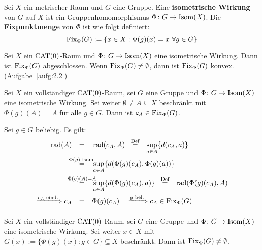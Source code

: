 \begin{definition}
\label{def:1.25}
	Sei $X$ ein metrischer Raum und $G$ eine Gruppe.
	Eine \textbf{isometrische Wirkung} von $G$ auf $X$ ist ein Gruppenhomomorphismus $\Phi \colon G \rightarrow \operatorname{Isom}(X)$. 
	Die \textbf{Fixpunktmenge} von $\Phi$ ist wie folgt definiert: 
	\[
		\operatorname{Fix}_\Phi(G) := \{x \in X : \Phi(g)(x) = x \ \forall g \in G\}
	\]
\end{definition}

\begin{lemma}
\label{lemma:1.26}
	Sei $X$ ein $\operatorname{CAT(0)}$-Raum und $\Phi\colon G \rightarrow \operatorname{Isom}(X)$ eine isometrische Wirkung.
	Dann ist $\operatorname{Fix}_\Phi(G)$ abgeschlossen.
	Wenn $\operatorname{Fix}_\Phi(G) \neq \emptyset$, dann ist $\operatorname{Fix}_\Phi(G)$ konvex. (Aufgabe~\ref{aufg:2.2}) 
\end{lemma}

\begin{satz}
\label{satz:1.27} \label{BTFT}
	Sei $X$ ein vollständiger $\operatorname{CAT(0)}$-Raum, sei $G$ eine Gruppe und $\Phi\colon G \rightarrow \operatorname{Isom}(X)$ eine isometrische Wirkung.  
	Sei weiter $\emptyset \neq A \subseteq X$ beschränkt mit $\Phi(g)(A) = A$ für alle $g \in G$.
	Dann ist $c_A \in \operatorname{Fix}_\Phi(G)$.
\end{satz}

\begin{beweis}
	Sei $g \in G$ beliebig.
	Es gilt:
	\begin{align*}
		\rad(A) &\stack{}{=} \rad(c_A,A) \stack{\text{Def}}{=} \sup_{a \in A}\{ d(c_A,a)\} \\
		&\stack{\Phi(g) \text{ isom.}}{=} \sup_{a \in A} \{d(\Phi(g)(c_A),\Phi(g)(a))\} \\
		&\stack{\Phi(g)(A)=A}{=} \sup_{a \in A} \{d(\Phi(g)(c_A),a)\} \stack{\text{Def}}{=} \rad(\Phi(g)(c_A),A) \\
		\xRightarrow{c_A \text{ eind.}} c_A &\stack{}{=} \Phi(g)(c_A) \quad \xRightarrow{g \text{ bel.}} c_A \in \Fix_\Phi(G) 
	\end{align*}
\end{beweis}

\begin{korollar}
\label{kor:1.28}
	Sei $X$ ein vollständiger $\operatorname{CAT(0)}$-Raum, sei $G$ eine Gruppe und $\Phi\colon G \rightarrow \operatorname{Isom}(X)$ eine isometrische Wirkung.
	Sei weiter $x \in X$ mit $G(x) := \{\Phi(g)(x) : g \in G\} \subseteq X$ beschränkt.
	Dann ist $\operatorname{Fix}_\Phi(G) \neq \emptyset$.
\end{korollar}

